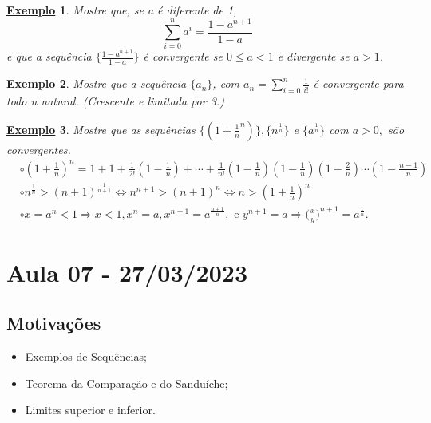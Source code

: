 \documentclass{article}
\newtheorem{example}{\underline{Exemplo}}
\begin{document}
\begin{example}
  Mostre que, se a \'e diferente de 1, 
  $$
    \sum\limits_{i=0}^{n}a^{i} = \frac{1-a^{n+1}}{1-a}
  $$
  e que a sequ\^encia $\biggl\{\frac{1-a^{n+1}}{1-a}\biggr\}$ \'e convergente se $0\leq{a}<1$ e divergente se $a > 1$.
\end{example}
\begin{example}
  Mostre que a sequ\^encia $\{a_{n}\}$, com $a_{n} = \displaystyle \sum\limits_{i=0}^{n}\frac{1}{i!}$ \'e convergente para todo n natural. (Crescente e limitada por 3.)
\end{example}
\begin{example}
  Mostre que as sequ\^encias $\biggl\{(1+\frac{1}{n}^{n})\biggr\}, \{n^{\frac{1}{n}}\}$ e $\{a^{\frac{1}{n}}\}$ com $a >0,$ s\~ao
convergentes.
 \begin{align*}
   &\circ (1+\frac{1}{n})^{n} = 1 + 1 + \frac{1}{2!}(1-\frac{1}{n}) + \cdots + \frac{1}{n!}(1-\frac{1}{n})(1-\frac{1}{n})(1-\frac{2}{n})\cdots(1-\frac{n-1}{n})\\
   &\circ n^{\frac{1}{n}} > (n+1)^{\frac{1}{n+1}}\Longleftrightarrow n^{n+1} > (n+1)^{n}\Longleftrightarrow n>(1+\frac{1}{n})^{n}\\
   &\circ x = a^{n} < 1\Rightarrow x < 1, x^{n} = a, x^{n+1} = a^{\frac{n+1}{n}},\text{ e } y^{n+1} = a \Rightarrow \biggl(\frac{x}{y}\biggr)^{n+1} = a^{\frac{1}{n}}.
 \end{align*}
\end{example}
\newpage

\section{Aula 07 - 27/03/2023}
\subsection{Motiva\c c\~oes}
 \begin{itemize}
   \item Exemplos de Sequ\^encias;
   \item Teorema da Compara\c c\~ao e do Sandu\'iche;
   \item Limites superior e inferior.
 \end{itemize}
\end{document}
